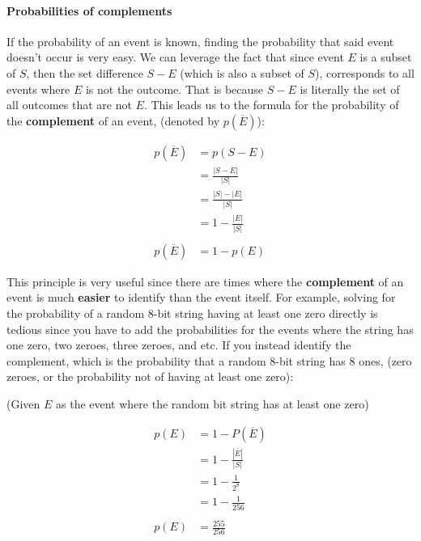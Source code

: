 \hypertarget{probabilities-of-complements}{%
\paragraph{Probabilities of
complements}\label{probabilities-of-complements}}

If the probability of an event is known, finding the probability that
said event doesn't occur is very easy. We can leverage the fact that
since event \textbf{\(E\)} is a subset of \textbf{\(S\)}, then the set
difference \textbf{\(S-E\)} (which is also a subset of \textbf{\(S\)}),
corresponds to all events where \textbf{\(E\)} is not the outcome. That
is because \textbf{\(S-E\)} is literally the set of all outcomes that
are not \textbf{\(E\)}. This leads us to the formula for the probability
of the \textbf{complement} of an event, (denoted by
\textbf{\(p(\overline{E})\)}):

\[
\begin{aligned}
    p(\overline{E}) &= p(S-E)\\
    &=\frac{|S-E|}{|S|}\\
    &=\frac{|S|-|E|}{|S|}\\
    &=1-\frac{|E|}{|S|}\\\\
    p(\overline{E})&=1-p(E)
\end{aligned}
\]

This principle is very useful since there are times where the
\textbf{complement} of an event is much \textbf{easier} to identify than
the event itself. For example, solving for the probability of a random
8-bit string having at least one zero directly is tedious since you have
to add the probabilities for the events where the string has one zero,
two zeroes, three zeroes, and etc. If you instead identify the
complement, which is the probability that a random 8-bit string has 8
ones, (zero zeroes, or the probability not of having at least one zero):

(Given \textbf{\(E\)} as the event where the random bit string has at
least one zero)

\[
\begin{aligned}
    p(E)&=1-P(\overline{E})\\
    &=1-\frac{|\overline{E}|}{|S|}\\
    &=1-\frac{1}{2^8}\\
    &=1-\frac{1}{256}\\\\
    p(E)&=\frac{255}{256}
\end{aligned}
\]

